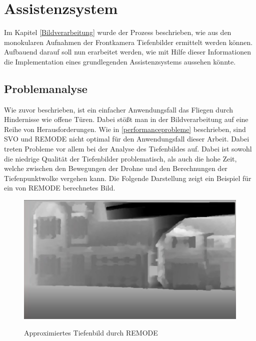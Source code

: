 

\newpage
\section{Assistenzsystem}
Im Kapitel \ref{Bildverarbeitung} wurde der Prozess beschrieben, wie aus den monokularen Aufnahmen der Frontkamera Tiefenbilder ermittelt werden können. Aufbauend darauf soll nun erarbeitet werden, wie mit Hilfe dieser Informationen die Implementation eines grundlegenden Assistenzsystems aussehen könnte.

\subsection{Problemanalyse}
Wie zuvor beschrieben, ist ein einfacher Anwendungsfall das Fliegen durch Hindernisse wie offene Türen. Dabei stößt man in der Bildverarbeitung auf eine Reihe von Herausforderungen. Wie in \ref{performanceprobleme} beschrieben, sind SVO und REMODE nicht optimal für den Anwendungsfall dieser Arbeit. Dabei treten Probleme vor allem bei der Analyse des Tiefenbildes auf. Dabei ist sowohl die niedrige Qualität der Tiefenbilder problematisch, als auch die hohe Zeit, welche zwischen den Bewegungen der Drohne und den Berechnungen der Tiefenpunktwolke vergehen kann. \newline
Die Folgende Darstellung zeigt ein Beispiel für ein von REMODE berechnetes Bild.

\begin{figure}[ht]
	\centering
	\includegraphics[scale=0.5]{Bilder/REMODE.jpg}
	\label{fig:REMODE}
	\caption{Approximiertes Tiefenbild durch REMODE}
\end{figure}

